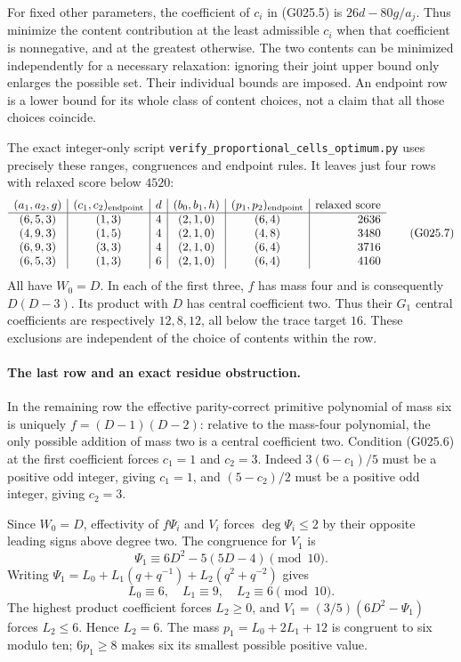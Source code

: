 For fixed other parameters, the coefficient of $c_i$
in (G025.5) is $26d-80g/a_j$. Thus minimize the
content contribution at the least admissible $c_i$
when that coefficient is nonnegative, and at the
greatest otherwise. The two contents can be minimized
independently for a necessary relaxation: ignoring
their joint upper bound only enlarges the possible
set. Their individual bounds are imposed. An endpoint
row is a lower bound for its whole class of content
choices, not a claim that all those choices coincide.

The exact integer-only script
\texttt{verify\_proportional\_cells\_optimum.py}
uses precisely these ranges, congruences and endpoint
rules. It leaves just four rows with relaxed score
below $4520$:
\[
\begin{array}{c|c|c|c|c|r}
(a_1,a_2,g)&(c_1,c_2)_{\rm endpoint}&d&(b_0,b_1,h)&
 (p_1,p_2)_{\rm endpoint}&\text{relaxed score}\\\hline
(6,5,3)&(1,3)&4&(2,1,0)&(6,4)&2636\\
(4,9,3)&(1,5)&4&(2,1,0)&(4,8)&3480\\
(6,9,3)&(3,3)&4&(2,1,0)&(6,4)&3716\\
(6,5,3)&(1,3)&6&(2,1,0)&(6,4)&4160
\end{array}                                                        \tag{G025.7}
\]
All have $W_0=D$. In each of the first three,
$f$ has mass four and is consequently $D(D-3)$.
Its product with $D$ has central coefficient two.
Thus their $G_1$ central coefficients are respectively
$12,8,12$, all below the trace target $16$.
These exclusions are independent of the choice of
contents within the row.

\paragraph{The last row and an exact residue obstruction.}
In the remaining row the effective parity-correct
primitive polynomial of mass six is uniquely
$f=(D-1)(D-2)$: relative to the mass-four polynomial,
the only possible addition of mass two is a central
coefficient two. Condition (G025.6) at the first
coefficient forces $c_1=1$ and $c_2=3$. Indeed
$3(6-c_1)/5$ must be a positive odd integer, giving
$c_1=1$, and $(5-c_2)/2$ must be a positive odd
integer, giving $c_2=3$.

Since $W_0=D$, effectivity of $f\Psi_i$ and $V_i$
forces $\deg\Psi_i\le2$ by their opposite leading
signs above degree two. The congruence for $V_1$ is
\[
 \Psi_1\equiv6D^2-5(5D-4)\pmod{10}.
\]
Writing $\Psi_1=L_0+L_1(q+q^{-1})+L_2(q^2+q^{-2})$
gives
\[
 L_0\equiv6,\quad L_1\equiv9,\quad L_2\equiv6
       \pmod{10}.                                      \tag{G025.8}
\]
The highest product coefficient forces $L_2\ge0$,
and $V_1=(3/5)(6D^2-\Psi_1)$ forces $L_2\le6$.
Hence $L_2=6$. The mass $p_1=L_0+2L_1+12$ is
congruent to six modulo ten; $6p_1\ge8$ makes
six its smallest possible positive value.


